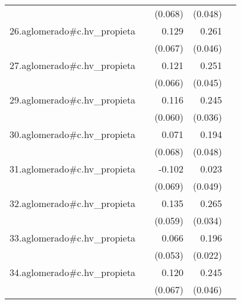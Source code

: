 {\begin{longtable}{l*{4}{D{.}{.}{-1}}}
            &                     &     (0.068)         &     (0.048)         &                     \\
\addlinespace
26.aglomerado#c.hv\_propieta&                     &       0.129         &       0.261\sym{***}&                     \\
            &                     &     (0.067)         &     (0.046)         &                     \\
\addlinespace
27.aglomerado#c.hv\_propieta&                     &       0.121         &       0.251\sym{***}&                     \\
            &                     &     (0.066)         &     (0.045)         &                     \\
\addlinespace
29.aglomerado#c.hv\_propieta&                     &       0.116         &       0.245\sym{***}&                     \\
            &                     &     (0.060)         &     (0.036)         &                     \\
\addlinespace
30.aglomerado#c.hv\_propieta&                     &       0.071         &       0.194\sym{***}&                     \\
            &                     &     (0.068)         &     (0.048)         &                     \\
\addlinespace
31.aglomerado#c.hv\_propieta&                     &      -0.102         &       0.023         &                     \\
            &                     &     (0.069)         &     (0.049)         &                     \\
\addlinespace
32.aglomerado#c.hv\_propieta&                     &       0.135\sym{*}  &       0.265\sym{***}&                     \\
            &                     &     (0.059)         &     (0.034)         &                     \\
\addlinespace
33.aglomerado#c.hv\_propieta&                     &       0.066         &       0.196\sym{***}&                     \\
            &                     &     (0.053)         &     (0.022)         &                     \\
\addlinespace
34.aglomerado#c.hv\_propieta&                     &       0.120         &       0.245\sym{***}&                     \\
            &                     &     (0.067)         &     (0.046)         &                     \\

\end{longtable}}
